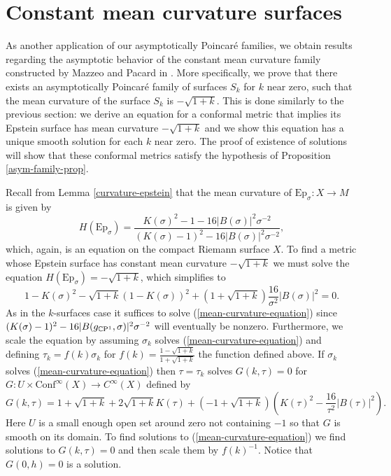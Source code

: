 \section{Constant mean curvature surfaces}


As another application of our asymptotically Poincar\'e families, we obtain results regarding the asymptotic behavior of the constant mean curvature family constructed by Mazzeo and Pacard in \cite{mazzeo-pacard2011}. 
More specifically, we prove that there exists an asymptotically Poincar\'e family of surfaces $S_k$ for $k$ near zero, such that the mean curvature of the surface $S_k$ is $-\sqrt{1+k}$. 
This is done similarly to the previous section: we derive an equation for a conformal metric that implies its Epstein surface has mean curvature $-\sqrt{1+k}$ and we show this equation has a unique smooth solution for each $k$ near zero. 
The proof of existence of solutions will show that these conformal metrics satisfy the hypothesis of Proposition \ref{asym-family-prop}.


Recall from Lemma \ref{curvature-epstein} that the mean curvature of $\mathrm{Ep}_\sigma: X \to M$ is given by 
\[
H(\mathrm{Ep}_\sigma)
= \frac{K(\sigma)^2 - 1 - 16|B(\sigma)|^2\sigma^{-2}}{(K(\sigma) - 1)^2 - 16|B(\sigma)|^2\sigma^{-2}},
\]
which, again, is an equation on the compact Riemann surface $X$.
To find a metric whose Epstein surface has constant mean curvature $-\sqrt{1+k}$ we must solve the equation $H(\mathrm{Ep}_\sigma) = -\sqrt{1+k}$, which simplifies to
\begin{equation}
\label{mean-curvature-equation}
1-K(\sigma)^2 - \sqrt{1+k}(1-K(\sigma))^2 + (1 + \sqrt{1+k})\frac{16}{\sigma^2}|B(\sigma)|^2 = 0.
\end{equation}
As in the $k$-surfaces case it suffices to solve (\ref{mean-curvature-equation}) since $(K(\sigma) - 1)^2 - 16|B(g_{\mathbb{C}\mathrm{P}^1},\sigma)|^2\sigma^{-2}$ will eventually be nonzero.
Furthermore, we scale the equation by assuming $\sigma_k$ solves (\ref{mean-curvature-equation}) and defining $\tau_k = f(k) \sigma_k$ for $f(k) = \frac{1-\sqrt{1+k}}{1+\sqrt{1+k}}$ the function defined above. 
If $\sigma_k$ solves (\ref{mean-curvature-equation}) then $\tau = \tau_k$ solves $G(k,\tau) = 0$ for $G: U \times \mathrm{Conf}^\infty(X) \to C^\infty(X)$ defined by 
\[
G(k,\tau) = 1+\sqrt{1+k} + 2\sqrt{1+k}K(\tau) + (-1 + \sqrt{1+k})(K(\tau)^2 - \frac{16}{\tau^2}|B(\tau)|^2).
\]
Here $U$ is a small enough open set around zero not containing $-1$ so that $G$ is smooth on its domain.
To find solutions to (\ref{mean-curvature-equation}) we find solutions to $G(k,\tau) = 0$ and then scale them by $f(k)^{-1}$. 
Notice that $G(0,h) = 0$ is a solution. 

